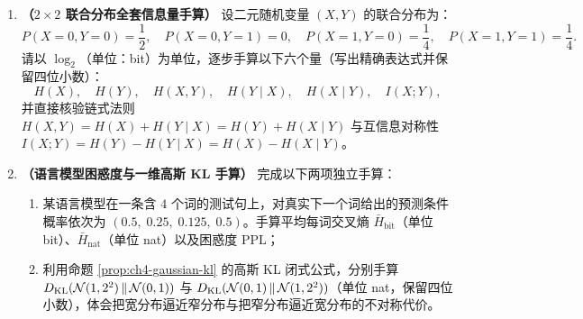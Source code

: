 \begin{enumerate}[label=\textbf{4.\arabic*}, leftmargin=2.4em, resume]
  \item \textbf{（$2\times 2$ 联合分布全套信息量手算）} 设二元随机变量 $(X, Y)$ 的联合分布为：
  \[
    P(X=0, Y=0) = \frac{1}{2}, \quad P(X=0, Y=1) = 0, \quad P(X=1, Y=0) = \frac{1}{4}, \quad P(X=1, Y=1) = \frac{1}{4}.
  \]
  请以 $\log_2$（单位：bit）为单位，逐步手算以下六个量（写出精确表达式并保留四位小数）：
  \[
    H(X),\quad H(Y),\quad H(X, Y),\quad H(Y \mid X),\quad H(X \mid Y),\quad I(X; Y),
  \]
  并直接核验链式法则 $H(X,Y) = H(X) + H(Y\mid X) = H(Y) + H(X\mid Y)$ 与互信息对称性 $I(X;Y) = H(Y) - H(Y\mid X) = H(X) - H(X\mid Y)$。

  \item \textbf{（语言模型困惑度与一维高斯 KL 手算）} 完成以下两项独立手算：
  \begin{enumerate}[label=(\arabic*), leftmargin=1.8em]
    \item 某语言模型在一条含 $4$ 个词的测试句上，对真实下一个词给出的预测条件概率依次为 $(0.5,\allowbreak\; 0.25,\allowbreak\; 0.125,\allowbreak\; 0.5)$。手算平均每词交叉熵 $\bar{H}_{\mathrm{bit}}$（单位 bit）、$\bar{H}_{\mathrm{nat}}$（单位 nat）以及困惑度 $\mathrm{PPL}$；
    \item 利用命题 \ref{prop:ch4-gaussian-kl} 的高斯 KL 闭式公式，分别手算 $D_{\mathrm{KL}}(\mathcal{N}(1, 2^2)\,\|\,\mathcal{N}(0, 1))$ 与 $D_{\mathrm{KL}}(\mathcal{N}(0, 1)\,\|\,\mathcal{N}(1, 2^2))$（单位 nat，保留四位小数），体会把宽分布逼近窄分布与把窄分布逼近宽分布的不对称代价。
  \end{enumerate}
\end{enumerate}


